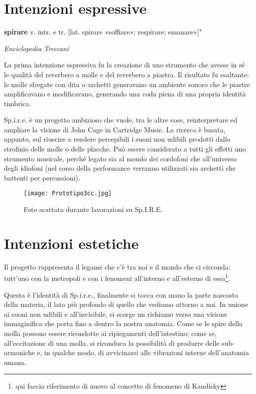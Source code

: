 
\section{Intenzioni espressive}

\epigraph{\textbf{spirare} v. intr. e tr. [lat. spirare «soffiare»; respirare; emanare»]"}
{\textit{Enciclopedia Treccani}}
La prima intenzione espressiva fu la creazione di uno strumento che avesse in sé le qualità del reverbero a molle e del reverbero a piastra. Il risultato fu esaltante: le molle sfregate con dita o archetti generavano un ambiente sonoro che le piastre amplificavano e modificavano, generando una coda piena di una propria identità timbrica.

Sp.i.r.e. è un progetto ambizioso che vuole, tra le altre cose, reinterpretare ed ampliare la visione di John Cage in Cartridge Music. La ricerca è basata, appunto, sul riuscire a rendere percepibili i suoni non udibili prodotti dallo strofinio delle molle o delle placche. Può essere considerato a tutti gli effetti uno strumento musicale, perché legato sia al mondo dei cordofoni che all'universo degli idiofoni (nel corso della performance verranno utilizzati sia archetti che battenti per percussioni).

\begin{figure}[htbp]
\begin{center}
\texttt{[image: Prototipo3cc.jpg]}
\caption{Foto scattata durante lavorazioni su Sp.I.R.E.}
\label{default}
\end{center}
\end{figure}


\section{Intenzioni estetiche}
Il progetto rappresenta il legame che c'è tra noi e il mondo che ci circonda: tutt'uno con la metropoli e con i fenomeni all'interno e all'esterno di essa\footnote{qui faccio riferimento di nuovo al concetto di fenomeno di Kandisky}.

Questa è l'identità di Sp.i.r.e., finalmente si tocca con mano la parte nascosta della materia, il lato più profondo di quello che vediamo attorno a noi. In unione ai suoni non udibili e all'invisibile, si scorge un richiamo verso una visione immaginifica che porta fino a dentro la nostra anatomia. Come se le spire della molla possono essere ricondotte ai ripiegamenti dell'intestino; come se, all'eccitazione di una molla, si riconduca la possibilità di produrre delle sub-armoniche e, in qualche modo, di avvicinarsi alle vibrazioni interne dell'anatomia umana.

